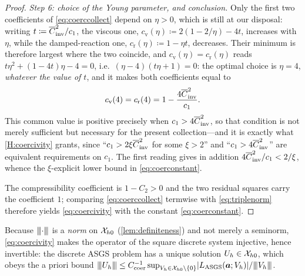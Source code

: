 \begin{proof}
\medskip\noindent\emph{Step 6: choice of the Young parameter, and conclusion.}
Only the first two coefficients of \eqref{eq:coerccollect} depend on $\eta>0$, which is still at
our disposal: writing $t\coloneqq\overline{C}_{\mathrm{inv}}^2/c_1$, the viscous one,
$c_{\mathrm v}(\eta)\coloneqq2(1-2/\eta)-4t$, increases with $\eta$, while the damped{\hyp}reaction one,
$c_{\mathrm r}(\eta)\coloneqq1-\eta t$, decreases. Their minimum is therefore largest where the two
coincide, and $c_{\mathrm v}(\eta)=c_{\mathrm r}(\eta)$ reads $t\eta^2+(1-4t)\eta-4=0$, i.e.\
$(\eta-4)(t\eta+1)=0$: the optimal choice is $\eta=4$, \emph{whatever the value of $t$}, and it
makes both coefficients equal to
\begin{equation}\label{eq:coercoeff}
  c_{\mathrm v}(4)=c_{\mathrm r}(4)=1-\frac{4\overline{C}_{\mathrm{inv}}^2}{c_1} .
\end{equation}
This common value is positive precisely when $c_1>4\overline{C}_{\mathrm{inv}}^2$, so that condition is not merely
sufficient but necessary for the present collection---and it is exactly what
\cref{H:coercivity} grants, since ``$c_1>2\xi\overline{C}_{\mathrm{inv}}^2$ for some $\xi>2$'' and
``$c_1>4\overline{C}_{\mathrm{inv}}^2$'' are equivalent requirements on $c_1$. The first reading gives in addition
$4\overline{C}_{\mathrm{inv}}^2/c_1<2/\xi$, whence the $\xi$-explicit lower bound in \eqref{eq:coerconstant}.

The compressibility coefficient is $1-C_2>0$ and the two residual squares carry the coefficient
$1$; comparing \eqref{eq:coerccollect} termwise with \eqref{eq:triplenorm} therefore yields
\eqref{eq:coercivity} with the constant \eqref{eq:coerconstant}.
\end{proof}

\noindent Because ${\lvert\kern-0.25ex\lvert\kern-0.25ex\lvert \cdot \rvert\kern-0.25ex\rvert\kern-0.25ex\rvert}$ is a \emph{norm} on $\mathcal{X}_{h0}$ (\cref{lem:definiteness}) and
not merely a seminorm, \eqref{eq:coercivity} makes the operator of the square discrete system
injective, hence invertible: the discrete ASGS problem has a unique solution $U_h\in\mathcal{X}_{h0}$, which
obeys the a priori bound
${\lvert\kern-0.25ex\lvert\kern-0.25ex\lvert U_h \rvert\kern-0.25ex\rvert\kern-0.25ex\rvert}\le C_{\mathrm{coer}}^{-1}\sup_{V_h\in\mathcal{X}_{h0}\setminus\{0\}}
\lvert L_{\mathrm{ASGS}}(\boldsymbol{a};V_h)\rvert/{\lvert\kern-0.25ex\lvert\kern-0.25ex\lvert V_h \rvert\kern-0.25ex\rvert\kern-0.25ex\rvert}$.

